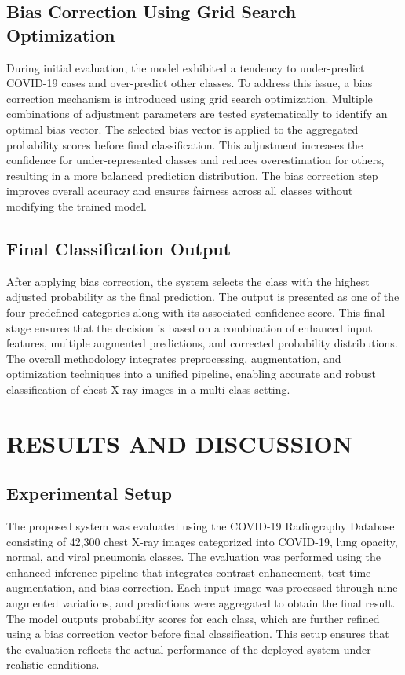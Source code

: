 \documentclass[a4paper,fleqn]{cas-dc}
\begin{document}
\subsection{Bias Correction Using Grid Search Optimization}
During initial evaluation, the model exhibited a tendency to under-predict COVID-19 cases and over-predict other classes. To address this issue, a bias correction mechanism is introduced using grid search optimization. Multiple combinations of adjustment parameters are tested systematically to identify an optimal bias vector. The selected bias vector is applied to the aggregated probability scores before final classification. This adjustment increases the confidence for under-represented classes and reduces overestimation for others, resulting in a more balanced prediction distribution. The bias correction step improves overall accuracy and ensures fairness across all classes without modifying the trained model.

\subsection{Final Classification Output}
After applying bias correction, the system selects the class with the highest adjusted probability as the final prediction. The output is presented as one of the four predefined categories along with its associated confidence score. This final stage ensures that the decision is based on a combination of enhanced input features, multiple augmented predictions, and corrected probability distributions. The overall methodology integrates preprocessing, augmentation, and optimization techniques into a unified pipeline, enabling accurate and robust classification of chest X-ray images in a multi-class setting.

\section{RESULTS AND DISCUSSION}

\subsection{Experimental Setup}
The proposed system was evaluated using the COVID-19 Radiography Database consisting of 42,300 chest X-ray images categorized into COVID-19, lung opacity, normal, and viral pneumonia classes. The evaluation was performed using the enhanced inference pipeline that integrates contrast enhancement, test-time augmentation, and bias correction. Each input image was processed through nine augmented variations, and predictions were aggregated to obtain the final result. The model outputs probability scores for each class, which are further refined using a bias correction vector before final classification. This setup ensures that the evaluation reflects the actual performance of the deployed system under realistic conditions.
\end{document}
